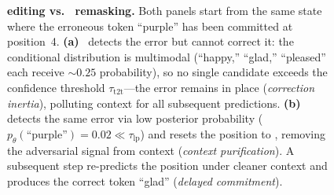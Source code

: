 \begin{figure}[t]
\caption{\textbf{\TtoT{} editing vs.\ \TtoM{} remasking.}
Both panels start from the same state where the erroneous token ``purple'' has been committed at position~4.
\textbf{(a)}~\TtoT{} detects the error but cannot correct it:
the conditional distribution is multimodal (``happy,'' ``glad,'' ``pleased'' each receive ${\sim}0.25$ probability),
so no single candidate exceeds the confidence threshold $\tau_{\text{t2t}}$---the error remains in place (\emph{correction inertia}), polluting context for all subsequent predictions.
\textbf{(b)}~\TtoM{} detects the same error via low posterior probability ($p_\theta(\text{``purple''}) = 0.02 \ll \tau_{\text{lp}}$) and resets the position to \mask{}, removing the adversarial signal from context (\emph{context purification}).
A subsequent \MtoT{} step re-predicts the position under cleaner context and produces the correct token ``glad'' (\emph{delayed commitment}).}
\label{fig:overview}
\end{figure}
